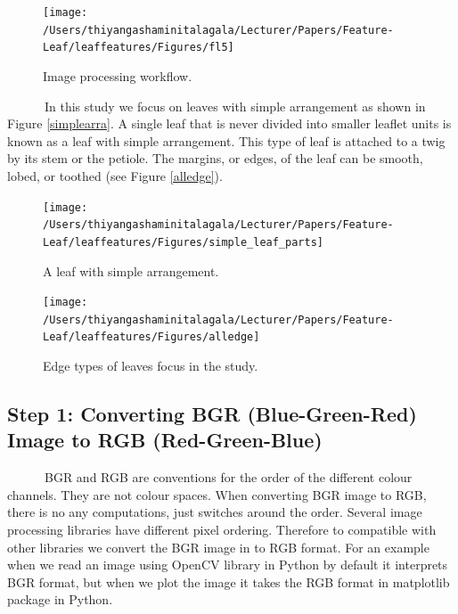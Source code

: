 \documentclass{article}
\begin{document}
\begin{figure}[!ht]

{\centering \texttt{[image: /Users/thiyangashaminitalagala/Lecturer/Papers/Feature-Leaf/leaffeatures/Figures/fl5]} 

}

\caption{\label{fig:test2}Image processing workflow.}\label{fig:unnamed-chunk-2}
\end{figure}

~~~~~~In this study we focus on leaves with simple arrangement as shown
in Figure \ref{simplearra}. A single leaf that is never divided into
smaller leaflet units is known as a leaf with simple arrangement. This
type of leaf is attached to a twig by its stem or the petiole. The
margins, or edges, of the leaf can be smooth, lobed, or toothed (see
Figure \ref{alledge}).

\begin{figure}[!ht]

{\centering \texttt{[image: /Users/thiyangashaminitalagala/Lecturer/Papers/Feature-Leaf/leaffeatures/Figures/simple\_leaf\_parts]} 

}

\caption{\label{simplearra} A leaf with simple arrangement.}\label{fig:unnamed-chunk-3}
\end{figure}

\begin{figure}[!ht]

{\centering \texttt{[image: /Users/thiyangashaminitalagala/Lecturer/Papers/Feature-Leaf/leaffeatures/Figures/alledge]} 

}

\caption{\label{alledge} Edge types of leaves focus in the study.}\label{fig:unnamed-chunk-4}
\end{figure}

\hypertarget{step-1-converting-bgr-blue-green-red-image-to-rgb-red-green-blue}{%
\subsection{Step 1: Converting BGR (Blue-Green-Red) Image to RGB
(Red-Green-Blue)}\label{step-1-converting-bgr-blue-green-red-image-to-rgb-red-green-blue}}

~~~~~~BGR and RGB are conventions for the order of the different colour
channels. They are not colour spaces. When converting BGR image to RGB,
there is no any computations, just switches around the order. Several
image processing libraries have different pixel ordering. Therefore to
compatible with other libraries we convert the BGR image in to RGB
format. For an example when we read an image using OpenCV library in
Python by default it interprets BGR format, but when we plot the image
it takes the RGB format in matplotlib package in Python.
\end{document}
